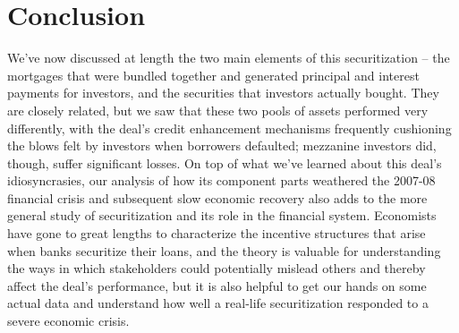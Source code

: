 \documentclass[12pt]{article}
\begin{document}
\section*{Conclusion}

We’ve now discussed at length the two main elements of this securitization – the mortgages that were bundled together and generated principal and interest payments for investors, and the securities that investors actually bought. They are closely related, but we saw that these two pools of assets performed very differently, with the deal’s credit enhancement mechanisms frequently cushioning the blows felt by investors when borrowers defaulted; mezzanine investors did, though, suffer significant losses. On top of what we’ve learned about this deal’s idiosyncrasies, our analysis of how its component parts weathered the 2007-08 financial crisis and subsequent slow economic recovery also adds to the more general study of securitization and its role in the financial system. Economists have gone to great lengths to characterize the incentive structures that arise when banks securitize their loans, and the theory is valuable for understanding the ways in which stakeholders could potentially mislead others and thereby affect the deal’s performance, but it is also helpful to get our hands on some actual data and understand how well a real-life securitization responded to a severe economic crisis.
\end{document}
